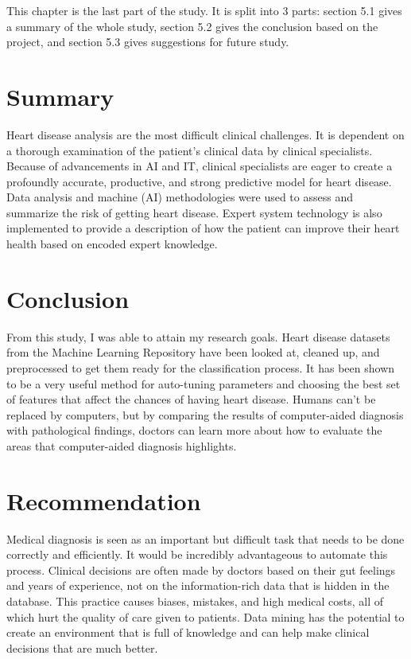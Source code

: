 This chapter is the last part of the study. It is split into 3 parts: section 5.1 gives a summary of the whole study, section 5.2 gives the conclusion based on the project, and section 5.3 gives suggestions for future study.

\section{Summary}
Heart disease analysis are the most difficult clinical challenges. It is dependent on a thorough examination of the patient's clinical data by clinical specialists. Because of advancements in AI and IT, clinical specialists are eager to create a profoundly accurate, productive, and strong predictive model for heart disease. Data analysis and machine (AI) methodologies were used to assess and summarize the risk of getting heart disease. Expert system technology is also implemented to provide a description of how the patient can improve their heart health based on encoded expert knowledge.

\section{Conclusion}
From this study, I was able to attain my research goals. Heart disease datasets from the Machine Learning Repository have been looked at, cleaned up, and preprocessed to get them ready for the classification process. It has been shown to be a very useful method for auto-tuning parameters and choosing the best set of features that affect the chances of having heart disease. Humans can't be replaced by computers, but by comparing the results of computer-aided diagnosis with pathological findings, doctors can learn more about how to evaluate the areas that computer-aided diagnosis highlights.

\section{Recommendation}
Medical diagnosis is seen as an important but difficult task that needs to be done correctly and efficiently. It would be incredibly advantageous to automate this process. Clinical decisions are often made by doctors based on their gut feelings and years of experience, not on the information-rich data that is hidden in the database. This practice causes biases, mistakes, and high medical costs, all of which hurt the quality of care given to patients. Data mining has the potential to create an environment that is full of knowledge and can help make clinical decisions that are much better.
